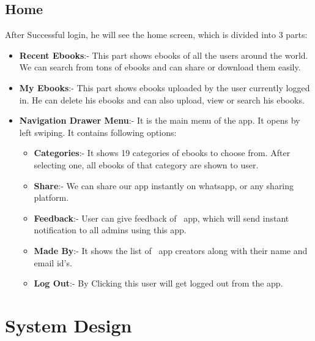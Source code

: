 	\subsection{Home}
	After Successful login, he will see the home screen, which is divided into 3 parts:
	\begin{itemize}
		\item \textbf{Recent Ebooks}:- This part shows ebooks of all the users around the world. We can search from tons of ebooks and can share or download them easily.
		\item \textbf{My Ebooks}:- This part shows ebooks uploaded by the user currently logged in. He can delete his ebooks and can also upload, view or search his ebooks.
		
		\item \textbf{Navigation Drawer Menu}:- It is the main menu of the app. It opens by left swiping. It contains following options:
		\begin{itemize}
			\item \textbf{Categories}:- It shows 19 categories of ebooks to choose from. After selecting one, all ebooks of that category are shown to user.
			
			\item \textbf{Share}:- We can share our app instantly on whatsapp, or any sharing platform.
			
			\item \textbf{Feedback}:- User can give feedback of \appName \ app, which will send instant notification to all admins using this app.
			
			\item \textbf{Made By}:-  It shows the list of \appName \ app creators along with their name and email id's.
			
			\item \textbf{Log Out}:- By Clicking this user will get logged out from the app.
		\end{itemize}
	\end{itemize}

\section{System Design}

